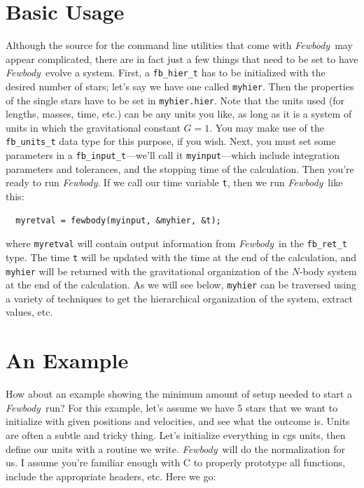 \documentclass[10pt,preprint]{aastex} %
\newcommand{\Fewbody}{{\em Fewbody\/}}
\begin{document}
\section{Basic Usage}\label{sec:basicusage}
Although the source for the command line utilities that come with \Fewbody\ may appear complicated,
there are in fact just a few things that need to be set to have \Fewbody\ evolve
a system.  First, a {\tt fb\_hier\_t} has to be initialized with the desired number
of stars; let's say we have one called {\tt myhier}.  Then the properties of the 
single stars have to be set in {\tt myhier.hier}.  Note that the units used (for 
lengths, masses, time, etc.) can be any units you like, as long as it is a system of units
in which the gravitational constant $G=1$.  You may make use of the {\tt fb\_units\_t}
data type for this purpose, if you wish.  Next, you must set some parameters
in a {\tt fb\_input\_t}---we'll call it {\tt myinput}---which include integration
parameters and tolerances, and the stopping time of the calculation.  Then you're 
ready to run \Fewbody.  If we call our time variable {\tt t}, then we run \Fewbody\
like this:
\begin{verbatim}
  myretval = fewbody(myinput, &myhier, &t);
\end{verbatim}
where {\tt myretval} will contain output information from \Fewbody\ in the {\tt fb\_ret\_t}
type.  The time {\tt t} will be updated with the time at the end of the calculation, and {\tt myhier}
will be returned with the gravitational organization of the $N$-body system at the end of
the calculation.  As we will see below, {\tt myhier} can be traversed using a variety of techniques
to get the hierarchical organization of the system, extract values, etc.

\section{An Example}\label{sec:example}
How about an example showing the minimum amount of setup needed to start a \Fewbody\
run?  For this example, let's assume we have 5 stars that we want to initialize
with given positions and velocities, and see what the outcome is.
Units are often a subtle and tricky thing.  Let's initialize everything in cgs
units, then define our units with a routine we write.  \Fewbody\ will do the normalization
for us.  I assume you're familiar enough with C to properly prototype all functions, 
include the appropriate headers, etc.  Here we go:
\end{document}
